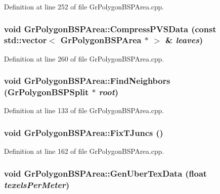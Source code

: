 Definition at line 252 of file GrPolygonBSPArea.cpp.\hypertarget{class_gr_polygon_b_s_p_area_1b7856f8931a29e532bb823fe9d0c78f}{
\subsubsection[{CompressPVSData}]{\setlength{\rightskip}{0pt plus 5cm}void GrPolygonBSPArea::CompressPVSData (const std::vector$<$ {\bf GrPolygonBSPArea} $\ast$ $>$ \& {\em leaves})}}
\label{class_gr_polygon_b_s_p_area_1b7856f8931a29e532bb823fe9d0c78f}




Definition at line 260 of file GrPolygonBSPArea.cpp.\hypertarget{class_gr_polygon_b_s_p_area_5149561c0870fd83f3a77d3e9b94072e}{
\subsubsection[{FindNeighbors}]{\setlength{\rightskip}{0pt plus 5cm}void GrPolygonBSPArea::FindNeighbors ({\bf GrPolygonBSPSplit} $\ast$ {\em root})}}
\label{class_gr_polygon_b_s_p_area_5149561c0870fd83f3a77d3e9b94072e}




Definition at line 133 of file GrPolygonBSPArea.cpp.\hypertarget{class_gr_polygon_b_s_p_area_2d77bc4b77ace5d859713e906db5e295}{
\subsubsection[{FixTJuncs}]{\setlength{\rightskip}{0pt plus 5cm}void GrPolygonBSPArea::FixTJuncs ()}}
\label{class_gr_polygon_b_s_p_area_2d77bc4b77ace5d859713e906db5e295}




Definition at line 162 of file GrPolygonBSPArea.cpp.\hypertarget{class_gr_polygon_b_s_p_area_ced30316ed0ae05a05b8b5242ae9cc73}{
\subsubsection[{GenUberTexData}]{\setlength{\rightskip}{0pt plus 5cm}void GrPolygonBSPArea::GenUberTexData (float {\em texelsPerMeter})}}
\label{class_gr_polygon_b_s_p_area_ced30316ed0ae05a05b8b5242ae9cc73}




